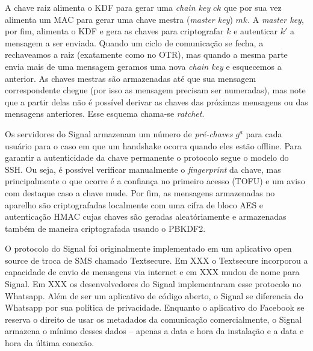 A chave raiz alimenta o KDF para gerar uma {\em chain key} $ck$ que por sua vez alimenta um MAC para gerar uma chave mestra ({\em master key}) $mk$.
A {\em master key}, por fim, alimenta o KDF e gera as chaves para criptografar $k$ e autenticar $k'$ a mensagem a ser enviada.
Quando um ciclo de comunicação se fecha, a rechaveamos a raiz (exatamente como no OTR), mas quando a mesma parte envia mais de uma mensagem geramos uma nova {\em chain key} e esquecemos a anterior.
As chaves mestras são armazenadas até que sua mensagem correspondente chegue (por isso as mensagem precisam ser numeradas), mas note que a partir delas não é possível derivar as chaves das próximas mensagens ou das mensagens anteriores.
Esse esquema chama-se {\em ratchet}.

Os servidores do Signal armazenam um número de {\em pré-chaves} $g^a$ para cada usuário para o caso em que um handshake ocorra quando eles estão offline.
Para garantir a autenticidade da chave permanente o protocolo segue o modelo do SSH.
Ou seja, é possível verificar manualmente o {\em fingerprint} da chave, mas principalmente o que ocorre é a confiança no primeiro acesso (TOFU) e um aviso com destaque caso a chave mude.
Por fim, as mensagens armazenadas no aparelho são criptografadas localmente com uma cifra de bloco AES e autenticação HMAC cujas chaves são geradas aleatóriamente e armazenadas também de maneira criptografada usando o PBKDF2.

O protocolo do Signal foi originalmente implementado em um aplicativo open source de troca de SMS chamado Textsecure.
Em XXX o Textsecure incorporou a capacidade de envio de mensagens via internet e em XXX mudou de nome para Signal.
Em XXX os desenvolvedores do Signal implementaram esse protocolo no Whatsapp.
Além de ser um aplicativo de código aberto, o Signal se diferencia do Whatsapp por sua política de privacidade.
Enquanto o aplicativo do Facebook se reserva o direito de usar os metadados da comunicação comercialmente, o Signal armazena o mínimo desses dados -- apenas a data e hora da instalação e a data e hora da última conexão.




